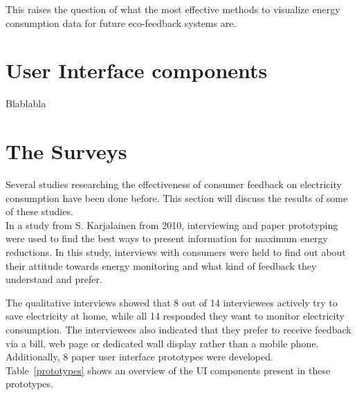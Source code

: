 \documentclass[journal]{vgtc}                %
\begin{document}
This raises the question of what the most effective methods to visualize energy consumption data for future eco-feedback systems are. 


\section{User Interface components}
Blablabla

\section{The Surveys}
Several studies researching the effectiveness of consumer feedback on electricity consumption have been done before.
This section will discuss the results of some of these studies. \\

In a study from S. Karjalainen\cite{karjalainen2011consumer} from 2010, interviewing and paper prototyping were used to find the best ways to present information for maximum energy reductions. In this study, interviews with consumers were held to find out about their attitude towards energy monitoring and what kind of feedback they understand and prefer.

The qualitative interviews showed that 8 out of 14 interviewees actively try to save electricity at home, while all 14 responded they want to monitor electricity consumption. The interviewees also indicated that they prefer to receive feedback via a bill, web page or dedicated wall display rather than a mobile phone. \\

Additionally, 8 paper user interface prototypes were developed. Table~\ref{prototypes} shows an overview of the UI components present in these prototypes. 
\end{document}
